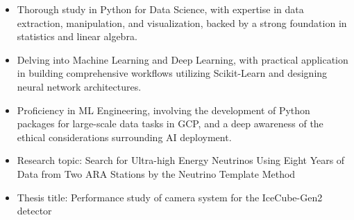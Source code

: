 \documentclass[10pt,a4paper,ragged2e,withhyper]{altacv}
\begin{document}

\begin{itemize}
\item Thorough study in Python for Data Science, with expertise in data extraction, manipulation, and visualization, backed by a strong foundation in statistics and linear algebra.
\item Delving into Machine Learning and Deep Learning, with practical application in building comprehensive workflows utilizing Scikit-Learn and designing neural network architectures.
\item Proficiency in ML Engineering, involving the development of Python packages for large-scale data tasks in GCP, and a deep awareness of the ethical considerations surrounding AI deployment.
\end{itemize}
\divider

\begin{itemize}
\item Research topic: Search for Ultra-high Energy Neutrinos Using Eight Years of Data from Two ARA Stations by the Neutrino Template Method
\end{itemize}
\divider

\begin{itemize}
\item Thesis title: Performance study of camera system for the IceCube-Gen2 detector
\end{itemize}
\divider







\dividerv\smallskip

\end{document}

